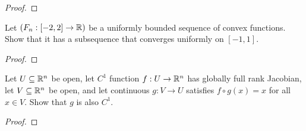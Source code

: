 \documentclass{report}
\begin{document}
\begin{proof}

\end{proof}
\begin{question}{}{}
Let $(F_n:[-2,2]\rightarrow \mathbb{R})$ be a uniformly bounded sequence of convex functions. Show that it has a subsequence that converges uniformly on $[-1,1]$. 
\end{question}
\begin{proof}

\end{proof}
\begin{question}{}{}
Let $U\subseteq \mathbb{R}^n$ be open, let $C^1$ function $f:U\rightarrow \mathbb{R}^n$ has globally full rank Jacobian, let $V \subseteq \mathbb{R}^n$ be open, and let continuous $g:V\rightarrow U$ satisfies $f\circ g(x)=x$ for all $x\in V$. Show that $g$ is also $C^1$. 
\end{question}
\begin{proof}

\end{proof}
\end{document}
